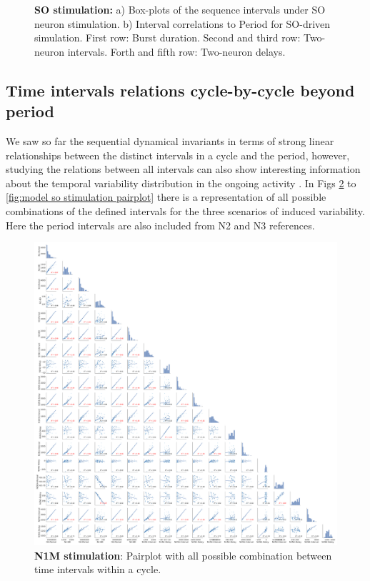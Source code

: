 \begin{figure}[hbt!]
\begin{minipage}[b]{0.53\textwidth}
\begin{minipage}[b]{\textwidth}
		\end{minipage}
	\end{minipage}
	\caption{\textbf{SO stimulation: }a) Box-plots of the sequence intervals under SO neuron stimulation. b) Interval correlations to Period for SO-driven simulation. First row: Burst duration. Second and third row: Two-neuron intervals. Forth and fifth row: Two-neuron delays.}
	\label{fig:invariant so}
\end{figure}



\subsection{Time intervals relations cycle-by-cycle beyond period}
We saw so far the sequential dynamical invariants in terms of strong linear relationships between the distinct intervals in a cycle and the period, however, studying the relations between all intervals can also show interesting information about the temporal variability distribution in the ongoing activity \cite{}. In Figs \ref{fig:model n1m stimulation pairplot} to \ref{fig:model so stimulation pairplot} there is a representation of all possible combinations of the defined intervals for the three scenarios of induced variability. Here the period intervals are also included from N2 and N3 references. 
 


\newpage
\begin{figure}[htbp]
	\centering
	\includegraphics[width=\textwidth]{./invariants/data/MODEL/n1m_driven/images/3phases/output_pairplot.pdf}
	\caption{\textbf{N1M stimulation}: Pairplot with all possible combination between time intervals within a cycle.}
	\label{fig:model n1m stimulation pairplot}
\end{figure}
 
